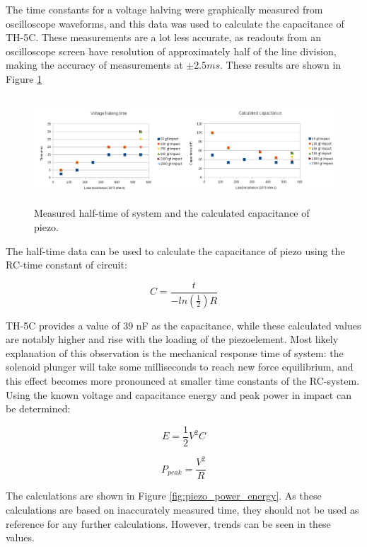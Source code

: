 The time constants for a voltage halving were graphically measured from oscilloscope waveforms, and this data was used to calculate the capacitance of TH-5C. These measurements are a lot less accurate, as readouts from an oscilloscope screen have resolution of approximately half of the line division, making the accuracy of measurements at $\pm 2.5 ms$. These results are shown in Figure \ref{fig:piezo_time_capacitance}

\begin{figure}[htb]
  \begin{center}
  \includegraphics[height=4cm]{images/own_measurement/piezo_capacitance}
  \end{center}
  \caption{Measured half-time of system and the calculated capacitance of piezo.}
  \label{fig:piezo_time_capacitance}
\end{figure}

The half-time data can be used to calculate the capacitance of piezo using the RC-time constant of circuit:

\begin{equation}
  C=\frac{t}{-ln(\frac{1}{2})R} 
\end{equation}

TH-5C provides a value of 39 nF as the capacitance, while these calculated values are notably higher and rise with the loading of the piezoelement. Most likely explanation of this observation is the mechanical response time of system: the solenoid plunger will take some milliseconds to reach new force equilibrium, and this effect becomes more pronounced at smaller time constants of the RC-system. Using the known voltage and capacitance energy and peak power in impact can be determined:
 
\begin{equation}
   E = \frac{1}{2}V^2C
\end{equation}

\begin{equation}
   P_{peak} = \frac{V^2}{R}
\end{equation}
 
The calculations are shown in  Figure \ref{fig:piezo_power_energy}. As these calculations are based on inaccurately measured time, they should not be used as reference for any further calculations. However, trends can be seen in these values. 
 
